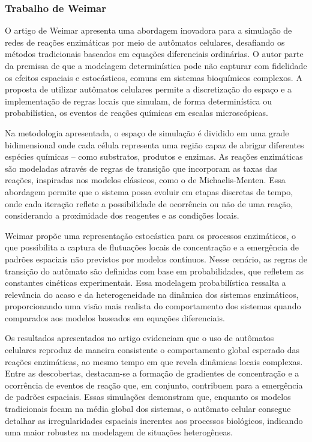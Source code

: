 \documentclass[12pt,oneside]{report}
\begin{document}
\subsubsection{Trabalho de Weimar \citeyear{weimar2002cellular}}

O artigo de Weimar \cite{weimar2002cellular} apresenta uma abordagem inovadora para a simulação de redes de reações enzimáticas por meio de autômatos celulares, desafiando os métodos tradicionais baseados em equações diferenciais ordinárias. O autor parte da premissa de que a modelagem determinística pode não capturar com fidelidade os efeitos espaciais e estocásticos, comuns em sistemas bioquímicos complexos. A proposta de utilizar autômatos celulares permite a discretização do espaço e a implementação de regras locais que simulam, de forma determinística ou probabilística, os eventos de reações químicas em escalas microscópicas.

Na metodologia apresentada, o espaço de simulação é dividido em uma grade bidimensional onde cada célula representa uma região capaz de abrigar diferentes espécies químicas – como substratos, produtos e enzimas. As reações enzimáticas são modeladas através de regras de transição que incorporam as taxas das reações, inspiradas nos modelos clássicos, como o de Michaelis-Menten. Essa abordagem permite que o sistema possa evoluir em etapas discretas de tempo, onde cada iteração reflete a possibilidade de ocorrência ou não de uma reação, considerando a proximidade dos reagentes e as condições locais.

Weimar propõe uma representação estocástica para os processos enzimáticos, o que possibilita a captura de flutuações locais de concentração e a emergência de padrões espaciais não previstos por modelos contínuos. Nesse cenário, as regras de transição do autômato são definidas com base em probabilidades, que refletem as constantes cinéticas experimentais. Essa modelagem probabilística ressalta a relevância do acaso e da heterogeneidade na dinâmica dos sistemas enzimáticos, proporcionando uma visão mais realista do comportamento dos sistemas quando comparados aos modelos baseados em equações diferenciais.

Os resultados apresentados no artigo evidenciam que o uso de autômatos celulares reproduz de maneira consistente o comportamento global esperado das reações enzimáticas, ao mesmo tempo em que revela dinâmicas locais complexas. Entre as descobertas, destacam-se a formação de gradientes de concentração e a ocorrência de eventos de reação que, em conjunto, contribuem para a emergência de padrões espaciais. Essas simulações demonstram que, enquanto os modelos tradicionais focam na média global dos sistemas, o autômato celular consegue detalhar as irregularidades espaciais inerentes aos processos biológicos, indicando uma maior robustez na modelagem de situações heterogêneas.
\end{document}
